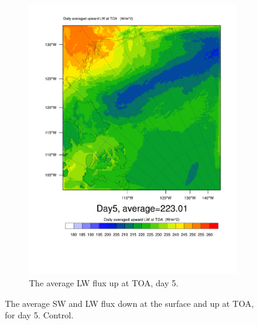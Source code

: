 \begin{figure}
\begin{subfigure}{0.48\textwidth}
		\includegraphics[width=\textwidth]{results/control/LWUPT_Day5.pdf}
		\caption{The average LW flux up at TOA, day 5.}
		\label{subfig:lwup_r1Day5}
	\end{subfigure}
	\caption{The average SW and LW flux down at the surface and up at TOA, for day 5. Control.}
	\label{fig:radiation_r1Day5}
\end{figure}

